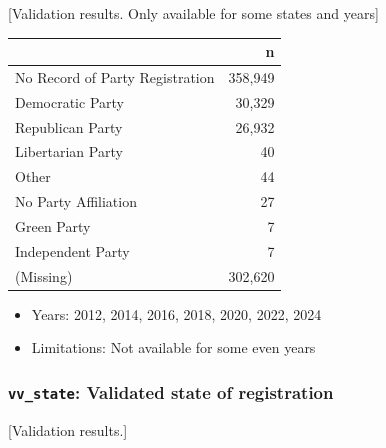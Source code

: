 \documentclass[10pt,article,oneside]{memoir}
\begin{document}
{[}Validation results. Only available for some states and years{]}

\begin{table}[H]
\centering
\begin{tabular}[t]{lr}
\toprule
 & n\\
\midrule
No Record of Party Registration & 358,949\\
Democratic Party & 30,329\\
Republican Party & 26,932\\
Libertarian Party & 40\\
Other & 44\\
No Party Affiliation & 27\\
Green Party & 7\\
Independent Party & 7\\
(Missing) & 302,620\\
\bottomrule
\end{tabular}
\end{table}

\begin{itemize}
\tightlist
\item
  Years: 2012, 2014, 2016, 2018, 2020, 2022, 2024
\item
  Limitations: Not available for some even years
\end{itemize}

\subsubsection{\texorpdfstring{\texttt{vv\_state}: Validated state of
registration}{vv\_state: Validated state of registration}}\label{vv_state-validated-state-of-registration}

{[}Validation results.{]}
\end{document}
